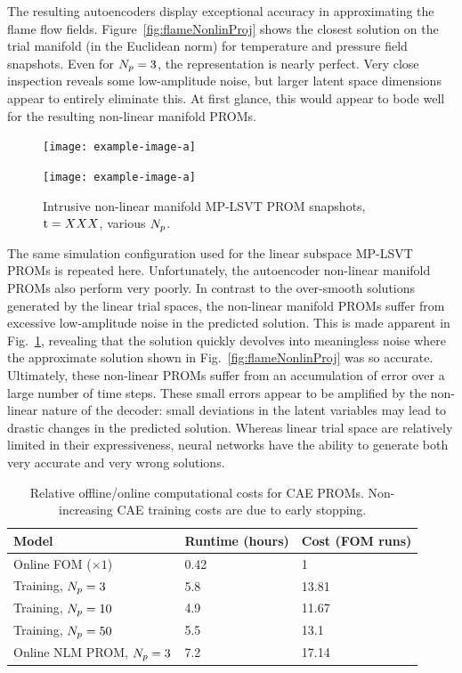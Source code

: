 The resulting autoencoders display exceptional accuracy in approximating the flame flow fields. Figure~\ref{fig:flameNonlinProj} shows the closest solution on the trial manifold (in the Euclidean norm) for temperature and pressure field snapshots. Even for $N_p = 3$, the representation is nearly perfect. Very close inspection reveals some low-amplitude noise, but larger latent space dimensions appear to entirely eliminate this. At first glance, this would appear to bode well for the resulting non-linear manifold PROMs.

\begin{figure}
    \begin{minipage}{0.49\linewidth}
        \texttt{[image: example-image-a]}
    \end{minipage}
    \begin{minipage}{0.49\linewidth}
        \texttt{[image: example-image-a]}
    \end{minipage}
    \caption{\label{fig:flameNonlinROM}Intrusive non-linear manifold MP-LSVT PROM snapshots, $\text{t} = XXX$, various $N_p$.}
\end{figure}

The same simulation configuration used for the linear subspace MP-LSVT PROMs is repeated here. Unfortunately, the autoencoder non-linear manifold PROMs also perform very poorly. In contrast to the over-smooth solutions generated by the linear trial spaces, the non-linear manifold PROMs suffer from excessive low-amplitude noise in the predicted solution. This is made apparent in Fig.~\ref{fig:flameNonlinROM}, revealing that the solution quickly devolves into meaningless noise where the approximate solution shown in Fig.~\ref{fig:flameNonlinProj} was so accurate. Ultimately, these non-linear PROMs suffer from an accumulation of error over a large number of time steps. These small errors appear to be amplified by the non-linear nature of the decoder: small deviations in the latent variables may lead to drastic changes in the predicted solution. Whereas linear trial space are relatively limited in their expressiveness, neural networks have the ability to generate both very accurate and very wrong solutions.

\begin{table}
	\centering
	\begin{tabular}{ lll }
	\toprule
	Model & Runtime (hours) & Cost (FOM runs)  \\
	\midrule
    Online FOM ($\times 1$) & 0.42 & 1 \\
    Training, $N_p = 3$ & 5.8 & 13.81 \\
    Training, $N_p = 10$ & 4.9 & 11.67 \\
    Training, $N_p = 50$ & 5.5 & 13.1 \\
    Online NLM PROM, $N_p = 3$ & 7.2 & 17.14 \\
	\bottomrule
	\end{tabular}
	\caption{\label{tab:caeCost}Relative offline/online computational costs for CAE PROMs. Non-increasing CAE training costs are due to early stopping.}
\end{table}

